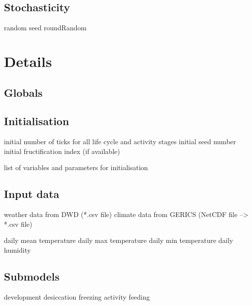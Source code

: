 \documentclass[a4paper, 11pt]{article}
\begin{document}
\subsection{Stochasticity}
random seed
roundRandom


\section{Details}

\subsection{Globals}


\subsection{Initialisation}
initial number of ticks for all life cycle and activity stages 
initial seed number
initial fructification index (if available)

list of variables and parameters for initialisation


\subsection{Input data}
weather data from DWD (*.csv file) 
climate data from GERICS (NetCDF file --> *.csv file) 

daily mean temperature
daily max temperature
daily min temperature
daily humidity


\subsection{Submodels}
development
desiccation
freezing
activity
feeding
\end{document}
